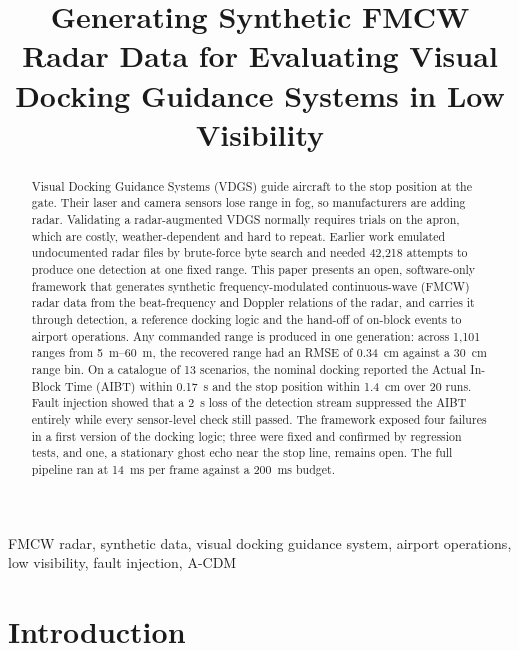 \documentclass[conference]{IEEEtran}
\title{Generating Synthetic FMCW Radar Data for Evaluating Visual Docking Guidance Systems in Low Visibility}
\author{
  \IEEEauthorblockN{Kashan Haider}
  \IEEEauthorblockA{\textit{Master System Integration} \\
  \textit{Source Integreta}\\
  Noida, India \\
  kashan@sourceintegreta.com}
}
\begin{document}
\maketitle

\begin{abstract}
Visual Docking Guidance Systems (VDGS) guide aircraft to the stop position at the gate. Their laser and camera sensors lose range in fog, so manufacturers are adding radar. Validating a radar-augmented VDGS normally requires trials on the apron, which are costly, weather-dependent and hard to repeat. Earlier work emulated undocumented radar files by brute-force byte search and needed 42{,}218 attempts to produce one detection at one fixed range. This paper presents an open, software-only framework that generates synthetic frequency-modulated continuous-wave (FMCW) radar data from the beat-frequency and Doppler relations of the radar, and carries it through detection, a reference docking logic and the hand-off of on-block events to airport operations. Any commanded range is produced in one generation: across 1{,}101 ranges from \SIrange{5}{60}{\metre}, the recovered range had an RMSE of \SI{0.34}{\centi\metre} against a \SI{30}{\centi\metre} range bin. On a catalogue of 13 scenarios, the nominal docking reported the Actual In-Block Time (AIBT) within \SI{0.17}{\second} and the stop position within \SI{1.4}{\centi\metre} over 20 runs. Fault injection showed that a \SI{2}{\second} loss of the detection stream suppressed the AIBT entirely while every sensor-level check still passed. The framework exposed four failures in a first version of the docking logic; three were fixed and confirmed by regression tests, and one, a stationary ghost echo near the stop line, remains open. The full pipeline ran at \SI{14}{\milli\second} per frame against a \SI{200}{\milli\second} budget.
\end{abstract}

\begin{IEEEkeywords}
FMCW radar, synthetic data, visual docking guidance system, airport operations, low visibility, fault injection, A-CDM
\end{IEEEkeywords}

\section{Introduction}
\label{sec:intro}
\end{document}
